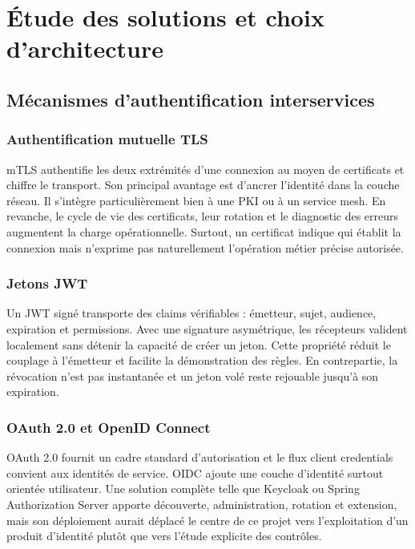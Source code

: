 \documentclass[12pt,a4paper,oneside]{report}
\begin{document}
\chapter{Étude des solutions et choix d'architecture}

\section{Mécanismes d'authentification interservices}

\subsection{Authentification mutuelle TLS}
mTLS authentifie les deux extrémités d'une connexion au moyen de certificats et
chiffre le transport. Son principal avantage est d'ancrer l'identité dans la
couche réseau. Il s'intègre particulièrement bien à une PKI ou à un service mesh.
En revanche, le cycle de vie des certificats, leur rotation et le diagnostic des
erreurs augmentent la charge opérationnelle. Surtout, un certificat indique qui
établit la connexion mais n'exprime pas naturellement l'opération métier précise
autorisée.

\subsection{Jetons JWT}
Un JWT signé transporte des claims vérifiables : émetteur, sujet, audience,
expiration et permissions. Avec une signature asymétrique, les récepteurs
valident localement sans détenir la capacité de créer un jeton. Cette propriété
réduit le couplage à l'émetteur et facilite la démonstration des règles. En
contrepartie, la révocation n'est pas instantanée et un jeton volé reste rejouable
jusqu'à son expiration.

\subsection{OAuth 2.0 et OpenID Connect}
OAuth 2.0 fournit un cadre standard d'autorisation et le flux client credentials
convient aux identités de service. OIDC ajoute une couche d'identité surtout
orientée utilisateur. Une solution complète telle que Keycloak ou Spring
Authorization Server apporte découverte, administration, rotation et extension,
mais son déploiement aurait déplacé le centre de ce projet vers l'exploitation
d'un produit d'identité plutôt que vers l'étude explicite des contrôles.
\end{document}
